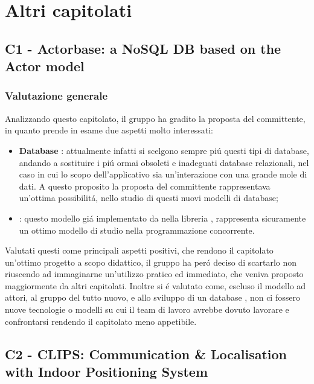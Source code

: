\section{Altri capitolati}

\subsection{C1 - Actorbase: a NoSQL DB based on the Actor model}
\subsubsection{Valutazione generale}
Analizzando questo capitolato, il gruppo ha gradito la proposta del committente, in quanto prende in esame due aspetti molto interessati:
\begin{itemize}
	\item \textbf{Database }: attualmente infatti si scelgono sempre pi\'u questi tipi di database, andando a sostituire i pi\'u ormai obsoleti e inadeguati database relazionali, nel caso in cui lo scopo dell'applicativo sia un'interazione con una grande mole di dati.
	A questo proposito la proposta del committente rappresentava un'ottima possibilit\'a, nello studio di questi nuovi modelli di database;
	\item \textbf{}: questo modello gi\'a implementato da nella libreria , rappresenta sicuramente un ottimo modello di studio nella programmazione concorrente.
\end{itemize}
Valutati questi come principali aspetti positivi, che rendono il capitolato un'ottimo progetto a scopo didattico, il gruppo ha per\'o deciso di scartarlo non riuscendo ad immaginarne un'utilizzo pratico ed immediato, che veniva proposto maggiormente da altri capitolati.
Inoltre si \'e valutato come, escluso il modello ad attori, al gruppo del tutto nuovo, e allo sviluppo di un database , non ci fossero nuove tecnologie o modelli su cui il team di lavoro avrebbe dovuto lavorare e confrontarsi rendendo il capitolato meno appetibile.  

\subsection{C2 - CLIPS: Communication \& Localisation with Indoor Positioning System}
